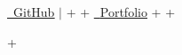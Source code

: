 \documentclass[letterpaper,10pt]{article}                                                                                                                                                                                                                                                                                                                                                                                                                                                                                                                                                                         +
\begin{document}
\begin{center}
     \href{https://github.com/saitejamukkera}{\faGithub \ \underline{GitHub}} $|$                                                                                                                                                                                                                                                                                                                                                                                                                                                                                                                                  +
                                                                                                                                                                                                                                                                                                                                                                                                                                                                                                                                                                                                                   +
     \href{https://www.saitejamukkera.dev}{\faGlobe \ \underline{Portfolio}}                                                                                                                                                                                                                                                                                                                                                                                                                                                                                                                                       +
                                                                                                                                                                                                                                                                                                                                                                                                                                                                                                                                                                                                                   +
 \end{center}                                                                                                                                                                                                                                                                                                                                                                                                                                                                                                                                                                                                      +
\end{document}
